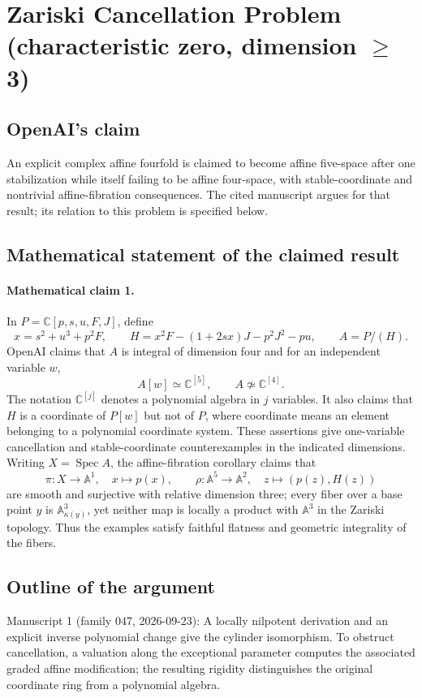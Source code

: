\documentclass[11pt]{article}
\begin{document}
\section*{Zariski Cancellation Problem (characteristic zero, dimension \(\geq\) 3)}

\subsection{OpenAI's claim}
An explicit complex affine fourfold is claimed to become affine five-space after one stabilization while itself failing to be affine four-space, with stable-coordinate and nontrivial affine-fibration consequences. The cited manuscript argues for that result; its relation to this problem is specified below.

\subsection{Mathematical statement of the claimed result}
\paragraph{Mathematical claim 1.} In $P=\mathbb C[p,s,u,F,J]$, define
\[
x=s^2+u^3+p^2F,\qquad H=x^2F-(1+2sx)J-p^2J^2-pu,\qquad A=P/(H).
\]
OpenAI claims that $A$ is integral of dimension four and for an independent variable $w$,
\[
A[w]\simeq\mathbb C^{[5]},\qquad A\not\simeq\mathbb C^{[4]}.
\]
The notation $\mathbb C^{[j]}$ denotes a polynomial algebra in $j$ variables. It also claims that $H$ is a coordinate of $P[w]$ but not of $P$, where coordinate means an element belonging to a polynomial coordinate system. These assertions give one-variable cancellation and stable-coordinate counterexamples in the indicated dimensions.
Writing $X=\operatorname{Spec}A$, the affine-fibration corollary claims that
\[
\pi:X\to\mathbb A^1,\quad x\mapsto p(x),\qquad
\rho:\mathbb A^5\to\mathbb A^2,\quad z\mapsto(p(z),H(z))
\]
are smooth and surjective with relative dimension three; every fiber over a base point $y$ is $\mathbb A^3_{\kappa(y)}$, yet neither map is locally a product with $\mathbb A^3$ in the Zariski topology. Thus the examples satisfy faithful flatness and geometric integrality of the fibers.

\subsection{Outline of the argument}
Manuscript 1 (family 047, 2026-09-23): A locally nilpotent derivation and an explicit inverse polynomial change give the cylinder isomorphism. To obstruct cancellation, a valuation along the exceptional parameter computes the associated graded affine modification; the resulting rigidity distinguishes the original coordinate ring from a polynomial algebra.
\end{document}
